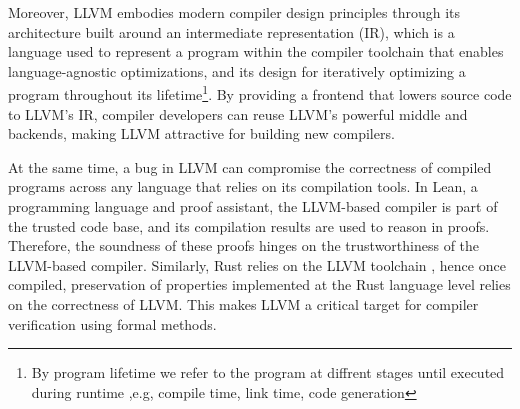 \documentclass[review, anonymous, acmsmall, screen]{acmart}
\begin{document}
Moreover, LLVM embodies modern compiler design principles through its architecture built around an 
intermediate representation (IR), which is a language used to represent a program within the compiler 
toolchain that enables language-agnostic optimizations, and its design for iteratively optimizing a 
program throughout its lifetime\footnote{By program lifetime we refer to the program at diffrent stages
until executed during runtime ,e.g, compile time, link time, code generation}. By providing a frontend
that lowers source code to LLVM's IR, compiler developers can reuse LLVM's powerful middle and backends,
making LLVM attractive for building new compilers.

At the same time, a bug in LLVM can compromise the correctness of compiled programs across any language
that relies on its compilation tools. In Lean, a programming language and proof assistant, the LLVM-based
compiler is part of the trusted code base, and its compilation results are used to reason in proofs. 
Therefore, the soundness of these proofs hinges on the trustworthiness of the LLVM-based compiler. Similarly,
Rust relies on the LLVM toolchain \cite{Rustlantis}, hence once compiled, preservation of properties 
implemented at the Rust language level relies on the correctness of LLVM. This makes LLVM a critical 
target for compiler verification using formal methods.
\end{document}
